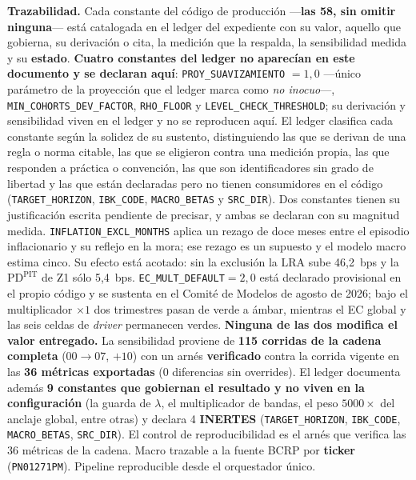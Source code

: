 \documentclass[12pt, a4paper]{article}
\newcommand{\PDPIT}{\ensuremath{\mathrm{PD}^{\mathrm{PIT}}}}
\newcommand{\LRA}{\ensuremath{\mathrm{LRA}}}
\begin{document}
\noindent\textbf{Trazabilidad.} Cada constante del código de producción ---\textbf{las 58, sin
omitir ninguna}--- está catalogada en el ledger del expediente con su valor, aquello que gobierna,
su derivación o cita, la medición que la respalda, la sensibilidad medida y su \textbf{estado}. \textbf{Cuatro constantes del ledger no aparecían en este documento
y se declaran aquí}: \texttt{PROY\_SUAVIZAMIENTO} $=1{,}0$ ---único parámetro de la proyección que
el ledger marca como \emph{no inocuo}---, \texttt{MIN\_COHORTS\_DEV\_FACTOR}, \texttt{RHO\_FLOOR}
y \texttt{LEVEL\_CHECK\_THRESHOLD}; su derivación y sensibilidad viven en el ledger y no se
reproducen aquí. El ledger clasifica cada constante según la solidez de su sustento, distinguiendo las que se derivan de una regla o norma citable, las que se eligieron contra una medición propia, las que responden a práctica o convención, las que son identificadores sin grado de libertad y las que están declaradas pero no tienen consumidores en el código (\texttt{TARGET\_HORIZON}, \texttt{IBK\_CODE}, \texttt{MACRO\_BETAS} y \texttt{SRC\_DIR}). Dos constantes tienen su justificación escrita pendiente de precisar, y ambas se declaran con su magnitud medida. \texttt{INFLATION\_EXCL\_MONTHS} aplica un rezago de doce meses entre el episodio inflacionario y su reflejo en la mora; ese rezago es un supuesto y el modelo macro estima cinco. Su efecto está acotado: sin la exclusión la \LRA{} sube 46,2~bps y la \PDPIT{} de Z1 sólo 5,4~bps. \texttt{EC\_MULT\_DEFAULT}$=2{,}0$ está declarado provisional en el propio código y se sustenta en el Comité de Modelos de agosto de 2026; bajo el multiplicador $\times1$ dos trimestres pasan de verde a ámbar, mientras el EC global y las seis celdas de \emph{driver} permanecen verdes. \textbf{Ninguna de las dos modifica el valor entregado.} La sensibilidad proviene de \textbf{115 corridas de la cadena completa}
($00\to07$, $+10$) con un arnés \textbf{verificado} contra la corrida vigente en las
\textbf{36 métricas exportadas} (0 diferencias sin overrides). El ledger documenta además
\textbf{9 constantes que gobiernan el resultado y no viven en la configuración} (la guarda de
$\lambda$, el multiplicador de bandas, el peso $5000\times$ del anclaje global, entre otras) y
declara 4 \textbf{INERTES} (\texttt{TARGET\_HORIZON}, \texttt{IBK\_CODE}, \texttt{MACRO\_BETAS},
\texttt{SRC\_DIR}). El control de reproducibilidad es el arnés que verifica las 36 métricas de la cadena.
Macro trazable a la fuente BCRP por \textbf{ticker} (\texttt{PN01271PM}). Pipeline reproducible desde el orquestador único.
\end{document}

